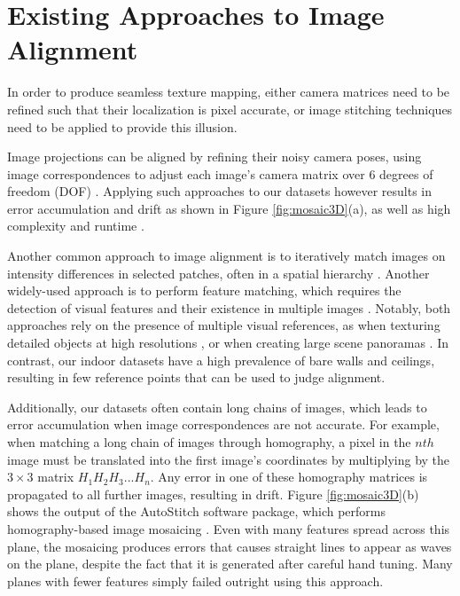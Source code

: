 \documentclass[10pt,twocolumn,letterpaper]{article}
\begin{document}
\section{Existing Approaches to Image Alignment}
\label{sec:existingApproaches}
In order to produce seamless texture mapping, either camera matrices
need to be refined such that their localization is pixel accurate, or
image stitching techniques need to be applied to provide this
illusion.

Image projections can be aligned by refining their noisy camera poses,
using image correspondences to adjust each image's camera matrix over
6 degrees of freedom (DOF) \cite{coorg1997matching, liu2010indoor,
  shum2000systems, szeliski1997creating}. Applying such approaches to
our datasets however results in error accumulation and drift as shown
in Figure \ref{fig:mosaic3D}(a), as well as high complexity and
runtime \cite{liu2010indoor}.

Another common approach to image alignment is to
iteratively match images on intensity differences in selected patches,
often in a spatial hierarchy \cite{hager1998efficient,
  lucas1981iterative, shum2000systems, szeliski2006image}. Another
widely-used approach is to perform feature matching, which requires
the detection of visual features and their existence in multiple
images \cite{brown2007automatic, cho2003automatic,
  mikolajczyk2005performance, szeliski2006image,
  yun2003comprehensive}. Notably, both approaches rely on the presence
of multiple visual references, as when texturing detailed objects at
high resolutions \cite{bernardinimultiplescans, wangmultipleviews}, or
when creating large scene panoramas \cite{agarwalapanoramas,
  bernardinimultiplescans, debevecviewdependent,
  snavelyphototourism}. In contrast, our indoor datasets have a high
prevalence of bare walls and ceilings, resulting in few reference
points that can be used to judge alignment.

Additionally, our datasets often contain long chains of images, which
leads to error accumulation when image correspondences are not
accurate. For example, when matching a long chain of images through
homography, a pixel in the $nth$ image must be translated into the
first image's coordinates by multiplying by the $3\times3$ matrix $H_1
H_2 H_3 ... H_n$. Any error in one of these homography matrices is
propagated to all further images, resulting in drift. Figure
\ref{fig:mosaic3D}(b) shows the output of the AutoStitch software
package, which performs homography-based image mosaicing
\cite{autostitch}. Even with many features spread across this plane,
the mosaicing produces errors that causes straight lines to appear as
waves on the plane, despite the fact that it is generated after
careful hand tuning. Many planes with fewer features simply failed
outright using this approach.
\end{document}
